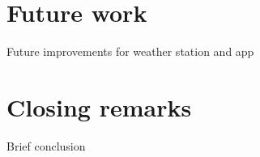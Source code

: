 \section{Future work}

Future improvements for weather station and app

\section{Closing remarks}

Brief conclusion
